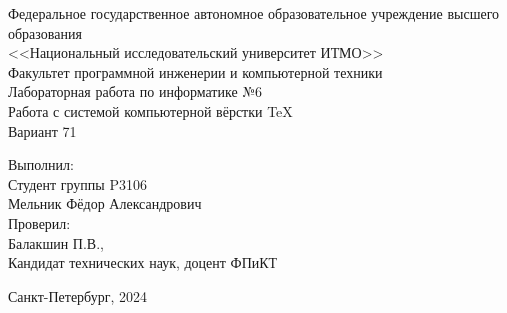 
    \begin{center}
        \vspace{-\baselineskip}
        \small Федеральное государственное автономное образовательное учреждение высшего образования\\
        <<Национальный исследовательский университет ИТМО>>\\
        \vspace{1cm}
        Факультет программной инженерии и компьютерной техники\\
        \vspace{10cm}
        Лабораторная работа по информатике №6\\
        \vspace{0.2cm}
        Работа с системой компьютерной вёрстки \TeX\\
        \vspace{0.2cm}
        Вариант 71\\
        \vspace{8cm}
    \end{center}
        \begin{flushright}
            \vspace{-\baselineskip}
            Выполнил:\\
            Студент группы P3106\\
            Мельник Фёдор Александрович\\
            Проверил:\\
            Балакшин П.В.,\\
            Кандидат технических наук, доцент ФПиКТ\\
        \end{flushright}
    \begin{center}
        \vspace{-\baselineskip}
        \vspace{0.75cm}
        Санкт-Петербург, 2024
    \end{center}
